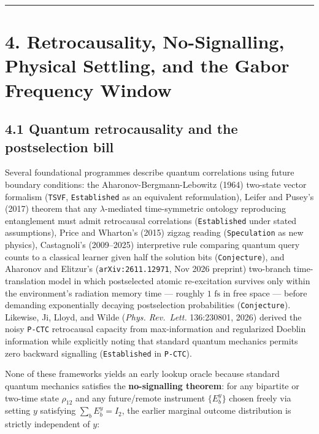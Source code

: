 \documentclass[10pt,letterpaper]{article}
\begin{document}
\begin{center}\rule{0.5\linewidth}{0.5pt}\end{center}

\section{4. Retrocausality, No-Signalling, Physical Settling, and the
Gabor Frequency
Window}\label{retrocausality-no-signalling-physical-settling-and-the-gabor-frequency-window}

\subsection{4.1 Quantum retrocausality and the postselection
bill}\label{quantum-retrocausality-and-the-postselection-bill}

Several foundational programmes describe quantum correlations using
future boundary conditions: the Aharonov-Bergmann-Lebowitz (1964)
two-state vector formalism (\texttt{TSVF}, \texttt{Established} as an
equivalent reformulation), Leifer and Pusey's (2017) theorem that any
\(\lambda\)-mediated time-symmetric ontology reproducing entanglement
must admit retrocausal correlations (\texttt{Established} under stated
assumptions), Price and Wharton's (2015) zigzag reading
(\texttt{Speculation} as new physics), Castagnoli's (2009--2025)
interpretive rule comparing quantum query counts to a classical learner
given half the solution bits (\texttt{Conjecture}), and Aharonov and
Elitzur's (\texttt{arXiv:2611.\allowbreak{}12971}, Nov 2026 preprint) two-branch
time-translation model in which postselected atomic re-excitation
survives only within the environment's radiation memory time --- roughly
\(1\text{ fs}\) in free space --- before demanding exponentially
decaying postselection probabilities (\texttt{Conjecture}). Likewise,
Ji, Lloyd, and Wilde (\emph{Phys. Rev.~Lett.} 136:230801, 2026) derived
the noisy \texttt{P-CTC} retrocausal capacity from max-information and
regularized Doeblin information while explicitly noting that standard
quantum mechanics permits zero backward signalling (\texttt{Established}
in \texttt{P-CTC}).

None of these frameworks yields an early lookup oracle because standard
quantum mechanics satisfies the \textbf{no-signalling theorem}: for any
bipartite or two-time state \(\rho_{12}\) and any future/remote
instrument \(\{E_b^y\}\) chosen freely via setting \(y\) satisfying
\(\sum_b E_b^y = I_2\), the earlier marginal outcome distribution is
strictly independent of \(y\):
\end{document}
